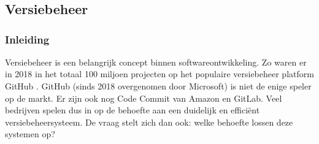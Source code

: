 \chapter{}
\label{ch:stand-van-zaken}
\graphicspath{{../../Images/}} 




\section{Versiebeheer}
\subsection{Inleiding}
\label{sec:vb_inleiding}
Versiebeheer is een belangrijk concept binnen softwareontwikkeling. Zo waren er in 2018 in het  totaal 100 miljoen projecten op het populaire versiebeheer platform GitHub \autocite{Git2018}. GitHub (sinds 2018 overgenomen door Microsoft) is niet de enige speler op de markt. Er zijn ook nog Code Commit van Amazon en GitLab. Veel bedrijven spelen dus in op de behoefte aan een duidelijk en efficiënt versiebeheersysteem. De vraag stelt zich dan ook: welke behoefte lossen deze systemen op?

